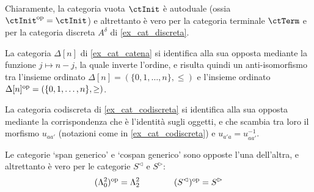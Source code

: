 \begin{example}
	Chiaramente, la categoria vuota \(\ctInit\) è autoduale (ossia \(\ctInit^\op=\ctInit\)) e altrettanto è vero per la categoria terminale \(\ctTerm\) e per la categoria discreta \(A^\delta\) di \ref{ex_cat_discreta}.

	La categoria \(\Delta[n]\) di \ref{ex_cat_catena} si identifica alla sua opposta mediante la funzione \(j\mapsto n-j\), la quale inverte l'ordine, e risulta quindi un anti-isomorfismo tra l'insieme ordinato \(\Delta[n]=(\{0,1,\dots,n\},\le)\) e l'insieme ordinato \(\Delta[n]^{\text{op}} = (\{0,1,\dots,n\},\ge)\).
	
	La categoria codiscreta di \ref{ex_cat_codiscreta} si identifica alla sua opposta mediante la corrispondenza che è l'identità sugli oggetti, e che scambia tra loro il morfismo $u_{aa'}$ (notazioni come in \ref{ex_cat_codiscreta}) e $u_{a'a} = u_{aa'}^{-1}$.

	Le categorie `span generico' e `cospan generico' sono opposte l'una dell'altra, e altrettanto è vero per le categorie \(S^\lhd\) e \(S^\rhd\):
	\[(\Lambda^2_0)^{\text{op}} = \Lambda^2_2\qquad\qquad (S^\lhd)^{\text{op}} = S^\rhd\]
\end{example}
